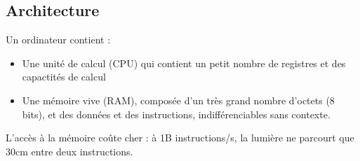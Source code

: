 \documentclass{cours}
\begin{document}
\subsection{Architecture}
Un ordinateur contient : 
\begin{itemize}
    \item Une unité de calcul (CPU) qui contient un petit nombre de registres et des capactités de calcul
    \item Une mémoire vive (RAM), composée d'un très grand nombre d'octets (8 bits), et des données et des instructions, indifférenciables sans contexte.
\end{itemize}
L'accès à la mémoire coûte cher : à 1B instructions/s, la lumière ne parcourt que 30cm entre deux instructions.
\end{document}
